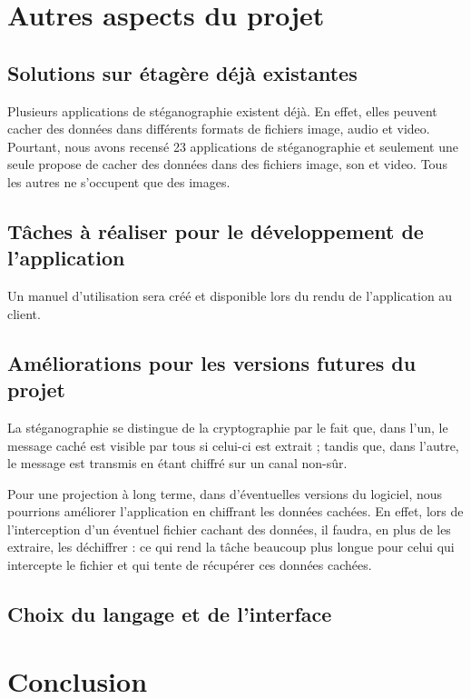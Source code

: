 \documentclass[11pt]{article}
\begin{document}
\section{Autres aspects du projet}
\subsection{Solutions sur étagère déjà existantes}
Plusieurs applications de stéganographie existent déjà. En effet, elles peuvent cacher des données dans différents formats de fichiers image, audio et video. 
Pourtant, nous avons recensé 23 applications de stéganographie et seulement une seule propose de cacher des données dans des fichiers image, son et video. 
Tous les autres ne s'occupent que des images. 

\subsection{Tâches à réaliser pour le développement de l'application} %
Un manuel d'utilisation sera créé et disponible lors du rendu de l'application au client. 

\subsection{Améliorations pour les versions futures du projet}
La stéganographie se distingue de la cryptographie par le fait que, dans l'un, le message caché est visible par tous si celui-ci est extrait ; tandis que, dans l'autre, 
le message est transmis en étant chiffré sur un canal non-sûr. 

Pour une projection à long terme, dans d'éventuelles versions du logiciel, nous pourrions améliorer l'application en chiffrant les données cachées. 
En effet, lors de l'interception d'un éventuel fichier cachant des données, il faudra, en plus de les extraire, les déchiffrer : ce qui rend la tâche beaucoup plus longue
pour celui qui intercepte le fichier et qui tente de récupérer ces données cachées. 

\subsection{Choix du langage et de l'interface}

\section{Conclusion}
\end{document}
